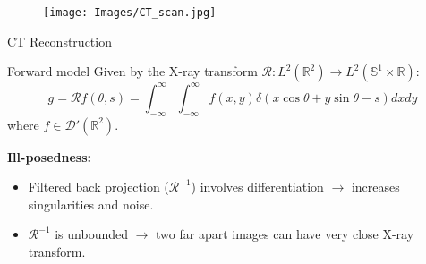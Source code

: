 \begin{frame}
\begin{figure}[!tbp]
\texttt{[image: Images/CT\_scan.jpg]}
\end{figure}
\end{frame}

\begin{frame}{CT Reconstruction}

\begin{block}{Forward model}
Given by the X-ray transform $\mathcal{R}: L^2(\mathbb{R}^2)\longrightarrow L^2(\mathbb{S}^1\times\mathbb{R})$:
$$
g = \mathcal{R}f(\theta,s)= \int_{-\infty}^{\infty}\int_{-\infty}^{\infty}f(x,y)\delta(x\cos\theta+y\sin\theta-s)dxdy
$$
where $f\in \mathcal{D}'(\mathbb{R}^2)$.
\end{block}

\pause
\bigskip

\textbf{Ill-posedness:}    
\begin{itemize}
\item Filtered back projection ($\mathcal{R}^{-1}$) involves differentiation $\longrightarrow$ increases singularities and noise.
 
\item $\mathcal{R}^{-1}$ is unbounded $\longrightarrow$ two far apart images can have very close X-ray transform.
\end{itemize}
\end{frame}


